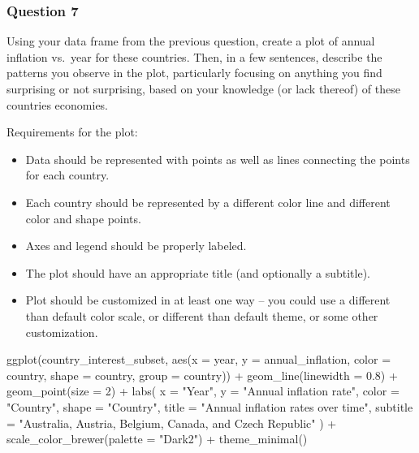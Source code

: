 \documentclass[
  letterpaper,
  DIV=11,
  numbers=noendperiod]{scrartcl}
\newenvironment{Shaded}{\begin{snugshade}}{\end{snugshade}}
\newcommand{\AttributeTok}[1]{\textcolor[rgb]{0.40,0.45,0.13}{#1}}
\newcommand{\DecValTok}[1]{\textcolor[rgb]{0.68,0.00,0.00}{#1}}
\newcommand{\FloatTok}[1]{\textcolor[rgb]{0.68,0.00,0.00}{#1}}
\newcommand{\FunctionTok}[1]{\textcolor[rgb]{0.28,0.35,0.67}{#1}}
\newcommand{\NormalTok}[1]{\textcolor[rgb]{0.00,0.23,0.31}{#1}}
\newcommand{\SpecialCharTok}[1]{\textcolor[rgb]{0.37,0.37,0.37}{#1}}
\newcommand{\StringTok}[1]{\textcolor[rgb]{0.13,0.47,0.30}{#1}}
\providecommand{\tightlist}{%
  \setlength{\itemsep}{0pt}\setlength{\parskip}{0pt}}
\begin{document}
\subsubsection{Question 7}\label{question-7}

Using your data frame from the previous question, create a plot of
annual inflation vs.~year for these countries. Then, in a few sentences,
describe the patterns you observe in the plot, particularly focusing on
anything you find surprising or not surprising, based on your knowledge
(or lack thereof) of these countries economies.

Requirements for the plot:

\begin{itemize}
\tightlist
\item
  Data should be represented with points as well as lines connecting the
  points for each country.
\item
  Each country should be represented by a different color line and
  different color and shape points.
\item
  Axes and legend should be properly labeled.
\item
  The plot should have an appropriate title (and optionally a subtitle).
\item
  Plot should be customized in at least one way -- you could use a
  different than default color scale, or different than default theme,
  or some other customization.
\end{itemize}

\begin{Shaded}
\begin{Highlighting}[]
\FunctionTok{ggplot}\NormalTok{(country\_interest\_subset, }\FunctionTok{aes}\NormalTok{(}\AttributeTok{x =}\NormalTok{ year, }\AttributeTok{y =}\NormalTok{ annual\_inflation,}
                             \AttributeTok{color =}\NormalTok{ country, }\AttributeTok{shape =}\NormalTok{ country, }\AttributeTok{group =}\NormalTok{ country)) }\SpecialCharTok{+}
  \FunctionTok{geom\_line}\NormalTok{(}\AttributeTok{linewidth =} \FloatTok{0.8}\NormalTok{) }\SpecialCharTok{+}
  \FunctionTok{geom\_point}\NormalTok{(}\AttributeTok{size =} \DecValTok{2}\NormalTok{) }\SpecialCharTok{+}
  \FunctionTok{labs}\NormalTok{(}
    \AttributeTok{x =} \StringTok{"Year"}\NormalTok{,}
    \AttributeTok{y =} \StringTok{"Annual inflation rate"}\NormalTok{,}
    \AttributeTok{color =} \StringTok{"Country"}\NormalTok{,}
    \AttributeTok{shape =} \StringTok{"Country"}\NormalTok{,}
    \AttributeTok{title =} \StringTok{"Annual inflation rates over time"}\NormalTok{,}
    \AttributeTok{subtitle =} \StringTok{"Australia, Austria, Belgium, Canada, and Czech Republic"}
\NormalTok{  ) }\SpecialCharTok{+}
  \FunctionTok{scale\_color\_brewer}\NormalTok{(}\AttributeTok{palette =} \StringTok{"Dark2"}\NormalTok{) }\SpecialCharTok{+}
  \FunctionTok{theme\_minimal}\NormalTok{()}
\end{Highlighting}
\end{Shaded}
\end{document}
